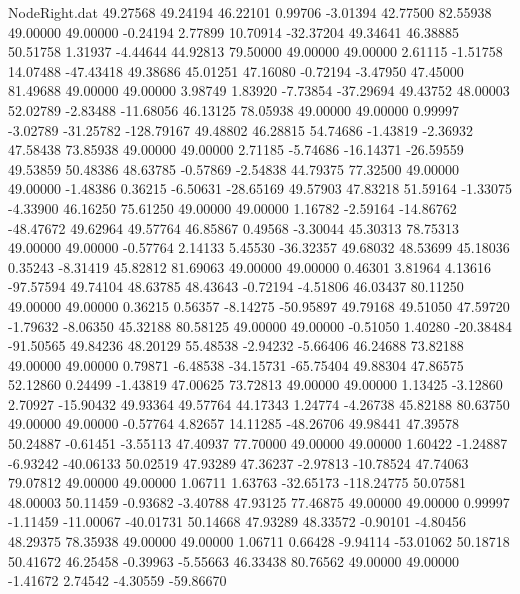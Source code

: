 \begin{filecontents}{NodeRight.dat}
  49.27568   49.24194   46.22101     0.99706   -3.01394   42.77500   82.55938   49.00000   49.00000   -0.24194    2.77899   10.70914  -32.37204
  49.34641   46.38885   50.51758     1.31937   -4.44644   44.92813   79.50000   49.00000   49.00000    2.61115   -1.51758   14.07488  -47.43418
  49.38686   45.01251   47.16080    -0.72194   -3.47950   47.45000   81.49688   49.00000   49.00000    3.98749    1.83920   -7.73854  -37.29694
  49.43752   48.00003   52.02789    -2.83488  -11.68056   46.13125   78.05938   49.00000   49.00000    0.99997   -3.02789  -31.25782 -128.79167
  49.48802   46.28815   54.74686    -1.43819   -2.36932   47.58438   73.85938   49.00000   49.00000    2.71185   -5.74686  -16.14371  -26.59559
  49.53859   50.48386   48.63785    -0.57869   -2.54838   44.79375   77.32500   49.00000   49.00000   -1.48386    0.36215   -6.50631  -28.65169
  49.57903   47.83218   51.59164    -1.33075   -4.33900   46.16250   75.61250   49.00000   49.00000    1.16782   -2.59164  -14.86762  -48.47672
  49.62964   49.57764   46.85867     0.49568   -3.30044   45.30313   78.75313   49.00000   49.00000   -0.57764    2.14133    5.45530  -36.32357
  49.68032   48.53699   45.18036     0.35243   -8.31419   45.82812   81.69063   49.00000   49.00000    0.46301    3.81964    4.13616  -97.57594
  49.74104   48.63785   48.43643    -0.72194   -4.51806   46.03437   80.11250   49.00000   49.00000    0.36215    0.56357   -8.14275  -50.95897
  49.79168   49.51050   47.59720    -1.79632   -8.06350   45.32188   80.58125   49.00000   49.00000   -0.51050    1.40280  -20.38484  -91.50565
  49.84236   48.20129   55.48538    -2.94232   -5.66406   46.24688   73.82188   49.00000   49.00000    0.79871   -6.48538  -34.15731  -65.75404
  49.88304   47.86575   52.12860     0.24499   -1.43819   47.00625   73.72813   49.00000   49.00000    1.13425   -3.12860    2.70927  -15.90432
  49.93364   49.57764   44.17343     1.24774   -4.26738   45.82188   80.63750   49.00000   49.00000   -0.57764    4.82657   14.11285  -48.26706
  49.98441   47.39578   50.24887    -0.61451   -3.55113   47.40937   77.70000   49.00000   49.00000    1.60422   -1.24887   -6.93242  -40.06133
  50.02519   47.93289   47.36237    -2.97813  -10.78524   47.74063   79.07812   49.00000   49.00000    1.06711    1.63763  -32.65173 -118.24775
  50.07581   48.00003   50.11459    -0.93682   -3.40788   47.93125   77.46875   49.00000   49.00000    0.99997   -1.11459  -11.00067  -40.01731
  50.14668   47.93289   48.33572    -0.90101   -4.80456   48.29375   78.35938   49.00000   49.00000    1.06711    0.66428   -9.94114  -53.01062
  50.18718   50.41672   46.25458    -0.39963   -5.55663   46.33438   80.76562   49.00000   49.00000   -1.41672    2.74542   -4.30559  -59.86670

\end{filecontents}

